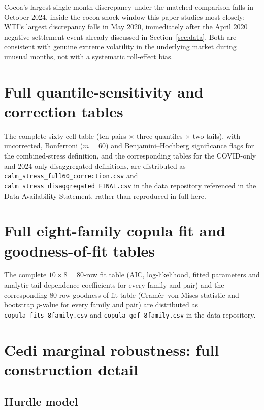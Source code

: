 \documentclass[final,3p,times,authoryear]{elsarticle}
\begin{document}
Cocoa's largest single-month discrepancy under the matched comparison
falls in October 2024, inside the cocoa-shock window this paper studies
most closely; WTI's largest discrepancy falls in May 2020, immediately
after the April 2020 negative-settlement event already discussed in
Section~\ref{sec:data}. Both are consistent with genuine extreme
volatility in the underlying market during unusual months, not with a
systematic roll-effect bias.

\section{Full quantile-sensitivity and correction tables}
\label{app:fullcorrection}

The complete sixty-cell table (ten pairs $\times$ three quantiles
$\times$ two tails), with uncorrected, Bonferroni ($m=60$) and
Benjamini--Hochberg significance flags for the combined-stress
definition, and the corresponding tables for the COVID-only and
2024-only disaggregated definitions, are distributed as
\texttt{calm\_stress\_full60\_correction.csv} and
\texttt{calm\_stress\_disaggregated\_FINAL.csv} in the data repository
referenced in the Data Availability Statement, rather than reproduced
in full here.

\section{Full eight-family copula fit and goodness-of-fit tables}
\label{app:fullcopula}

The complete $10 \times 8 = 80$-row fit table (AIC, log-likelihood,
fitted parameters and analytic tail-dependence coefficients for every
family and pair) and the corresponding $80$-row goodness-of-fit table
(Cram\'er--von Mises statistic and bootstrap $p$-value for every family
and pair) are distributed as \texttt{copula\_fits\_8family.csv} and
\texttt{copula\_gof\_8family.csv} in the data repository.

\section{Cedi marginal robustness: full construction detail}
\label{app:cedi-robustness}

\subsection{Hurdle model}
\end{document}
